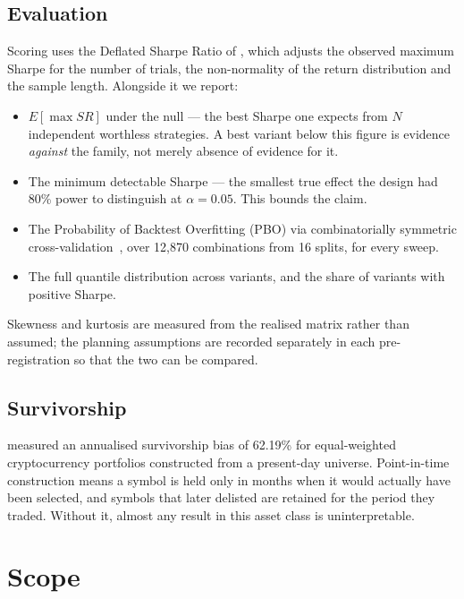 \documentclass[11pt,a4paper]{article}
\begin{document}
\subsection{Evaluation}

Scoring uses the Deflated Sharpe Ratio of \citet{bailey2014}, which adjusts
the observed maximum Sharpe for the number of trials, the non-normality of
the return distribution and the sample length. Alongside it we report:

\begin{itemize}
\item $E[\max SR]$ under the null --- the best Sharpe one expects from $N$
      independent worthless strategies. A best variant below this figure is
      evidence \emph{against} the family, not merely absence of evidence for it.
\item The minimum detectable Sharpe --- the smallest true effect the design
      had 80\% power to distinguish at $\alpha = 0.05$. This bounds the claim.
\item The Probability of Backtest Overfitting (PBO) via combinatorially
      symmetric cross-validation~\citep{bailey2017}, over 12{,}870
      combinations from 16 splits, for every sweep.
\item The full quantile distribution across variants, and the share of
      variants with positive Sharpe.
\end{itemize}

Skewness and kurtosis are measured from the realised matrix rather than
assumed; the planning assumptions are recorded separately in each
pre-registration so that the two can be compared.

\subsection{Survivorship}

\citet{ammann2022} measured an annualised survivorship bias of 62.19\% for
equal-weighted cryptocurrency portfolios constructed from a present-day
universe. Point-in-time construction means a symbol is held only in months
when it would actually have been selected, and symbols that later delisted
are retained for the period they traded. Without it, almost any result in
this asset class is uninterpretable.

\section{Scope}
\end{document}
